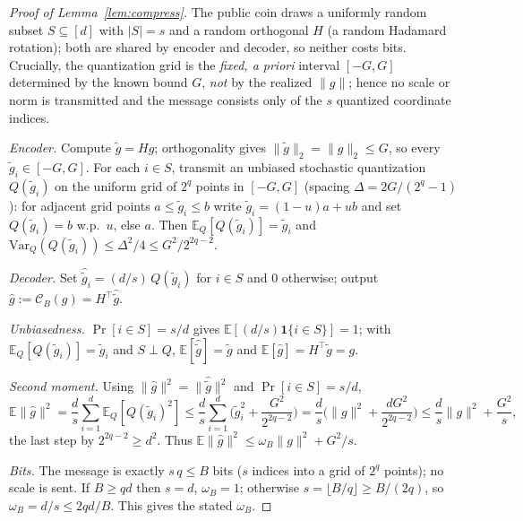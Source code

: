 \documentclass[11pt]{article}
\theoremstyle{definition}
\newcommand{\E}{\mathbb{E}}
\newcommand{\Ccal}{\mathcal{C}}
\begin{document}
\begin{proof}[Proof of Lemma~\ref{lem:compress}]
The public coin draws a uniformly random subset $S\subseteq[d]$ with $|S|=s$ and a random orthogonal $H$
(a random Hadamard rotation); both are shared by encoder and decoder, so neither costs bits. Crucially,
the quantization grid is the \emph{fixed, a priori} interval $[-G,G]$ determined by the known bound $G$,
\emph{not} by the realized $\|g\|$; hence no scale or norm is transmitted and the message consists only
of the $s$ quantized coordinate indices.

\emph{Encoder.} Compute $\tilde g=Hg$; orthogonality gives $\|\tilde g\|_2=\|g\|_2\le G$, so every
$\tilde g_i\in[-G,G]$. For each $i\in S$, transmit an unbiased stochastic quantization $Q(\tilde g_i)$ on
the uniform grid of $2^q$ points in $[-G,G]$ (spacing $\Delta=2G/(2^q-1)$): for adjacent grid points
$a\le\tilde g_i\le b$ write $\tilde g_i=(1-u)a+ub$ and set $Q(\tilde g_i)=b$ w.p.\ $u$, else $a$. Then
$\E_Q[Q(\tilde g_i)]=\tilde g_i$ and $\mathrm{Var}_Q(Q(\tilde g_i))\le\Delta^2/4\le G^2/2^{2q-2}$.

\emph{Decoder.} Set $\hat{\tilde g}_i=(d/s)\,Q(\tilde g_i)$ for $i\in S$ and $0$ otherwise; output
$\hat g:=\Ccal_B(g)=H^\top\hat{\tilde g}$.

\emph{Unbiasedness.} $\Pr[i\in S]=s/d$ gives $\E[(d/s)\mathbf 1\{i\in S\}]=1$; with
$\E_Q[Q(\tilde g_i)]=\tilde g_i$ and $S\perp Q$, $\E[\hat{\tilde g}]=\tilde g$ and $\E[\hat g]=H^\top\tilde g=g$.

\emph{Second moment.} Using $\|\hat g\|^2=\|\hat{\tilde g}\|^2$ and $\Pr[i\in S]=s/d$,
\[
  \E\|\hat g\|^2=\frac{d}{s}\sum_{i=1}^d\E_Q[Q(\tilde g_i)^2]
  \le\frac{d}{s}\sum_{i=1}^d\Big(\tilde g_i^2+\frac{G^2}{2^{2q-2}}\Big)
  =\frac{d}{s}\Big(\|g\|^2+\frac{dG^2}{2^{2q-2}}\Big)
  \le\frac{d}{s}\|g\|^2+\frac{G^2}{s},
\]
the last step by $2^{2q-2}\ge d^2$. Thus $\E\|\hat g\|^2\le\omega_B\|g\|^2+G^2/s$.

\emph{Bits.} The message is exactly $s\,q\le B$ bits ($s$ indices into a grid of $2^q$ points); no scale
is sent. If $B\ge qd$ then $s=d$, $\omega_B=1$; otherwise $s=\lfloor B/q\rfloor\ge B/(2q)$, so
$\omega_B=d/s\le 2qd/B$. This gives the stated $\omega_B$.
\end{proof}
\end{document}
